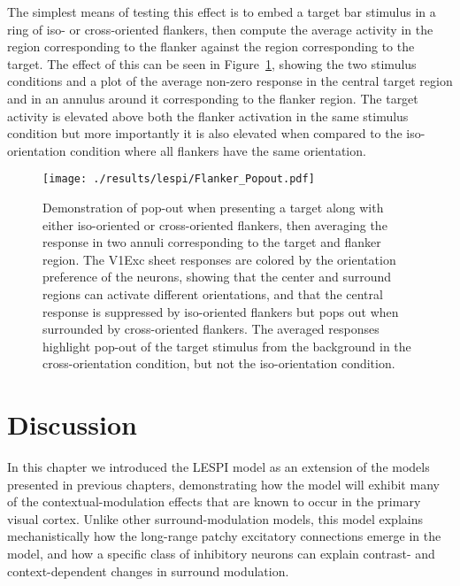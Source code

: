 The simplest means of testing this effect is to embed a target bar
stimulus in a ring of iso- or cross-oriented flankers, then compute
the average activity in the region corresponding to the flanker
against the region corresponding to the target. The
effect of this can be seen in Figure~\ref{Flanker_PopOut}, showing the
two stimulus conditions and a plot of the average non-zero response in
the central target region and in an annulus around it corresponding to
the flanker region. The target activity is elevated above both the
flanker activation in the same stimulus condition but more importantly
it is also elevated when compared to the iso-orientation condition
where all flankers have the same orientation.

\begin{figure}
	\centering
        \texttt{[image: ./results/lespi/Flanker\_Popout.pdf]}
	\caption[Pop-out effect in simple flanker paradigm.]{Demonstration
      of pop-out when presenting a target along with either
      iso-oriented or cross-oriented flankers, then averaging the
      response in two annuli corresponding to the target and flanker
      region. The V1Exc sheet responses are colored by the
      orientation preference of the neurons, showing that the center
      and surround regions can activate different orientations, and
      that the central response is suppressed by iso-oriented flankers
      but pops out when surrounded by cross-oriented flankers.
      The averaged responses
      highlight pop-out of the target stimulus from the background in
      the cross-orientation condition, but not the iso-orientation
      condition.}
	\label{Flanker_PopOut}
\end{figure}

\section{Discussion}

In this chapter we introduced the LESPI model as an extension of the
models presented in previous chapters, demonstrating how the model
will exhibit many of the contextual-modulation effects that are known
to occur in the primary visual cortex. Unlike other
surround-modulation models, this model explains mechanistically how the
long-range patchy excitatory connections emerge in the model, and how a
specific class of inhibitory neurons can explain contrast- and
context-dependent changes in surround modulation.

